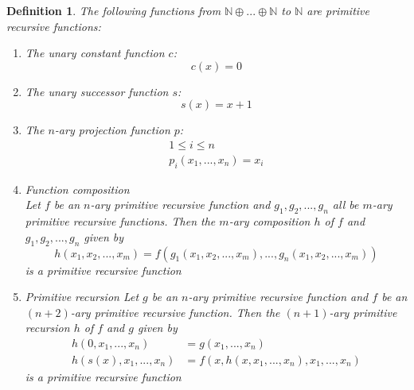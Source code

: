 \documentclass[12pt, letterpaper]{article}
\newtheorem*{definition}{Definition}
\theoremstyle{case}
\begin{document}
    \begin{definition}
      The following functions from $\mathbb{N} \oplus ... \oplus \mathbb{N}$ to $\mathbb{N}$
      are primitive recursive functions:
      \begin{enumerate}
        \item The unary constant function $c$:
        \begin{equation*}
          c(x) = 0
        \end{equation*}
        \item The unary successor function $s$:
        \begin{equation*}
          s(x) = x + 1
        \end{equation*}
        \item The $n$-ary projection function $p$:
        \begin{equation*}
          \begin{gathered}
            1 \leq i \leq n
            \\
            p_i(x_1, ..., x_n) = x_i
          \end{gathered}
        \end{equation*}
        \item Function composition \\
        Let $f$ be an $n$-ary primitive recursive function and $g_1, g_2, ..., g_n$ all be $m$-ary
        primitive recursive functions. Then the $m$-ary composition $h$ of $f$ and $g_1, g_2, ..., g_n$ given by
        \begin{equation*}
          h(x_1, x_2, ..., x_m) = f(g_1(x_1, x_2, ..., x_m), ..., g_n(x_1, x_2, ..., x_m))
        \end{equation*}
        is a primitive recursive function
        \item Primitive recursion
        Let $g$ be an $n$-ary primitive recursive function and $f$ be an $(n + 2)$-ary primitive recursive
        function. Then the $(n + 1)$-ary primitive recursion $h$ of $f$ and $g$ given by
        \begin{equation*}
          \begin{aligned}
            h(0, x_1, ..., x_n) &= g(x_1, ..., x_n)
            \\
            h(s(x), x_1, ..., x_n) &= f(x, h(x, x_1, ..., x_n), x_1, ..., x_n)
          \end{aligned}
        \end{equation*}
        is a primitive recursive function
      \end{enumerate}
    \end{definition}
\end{document}
